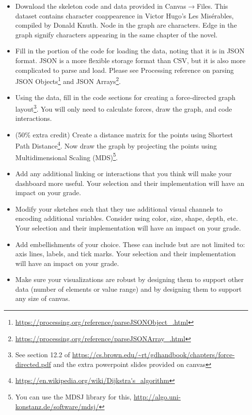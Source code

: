 \documentclass[a4paper,12pt]{article}
\begin{document}
\begin{itemize}

\item Download the skeleton code and data provided in Canvas$\rightarrow$Files. This dataset contains character coappearence in Victor Hugo's Les Misérables, compiled by Donald Knuth. Node in the graph are characters. Edge in the graph signify characters appearing in the same chapter of the novel.

\item Fill in the portion of the code for loading the data, noting that it is in JSON format. JSON is a more flexible storage format than CSV, but it is also more complicated to parse and load. Please see Processing reference on parsing JSON Objects\footnote{\url{https://processing.org/reference/parseJSONObject_.html}} and JSON Arrays\footnote{\url{https://processing.org/reference/parseJSONArray_.html}}.

\item Using the data, fill in the code sections for creating a force-directed graph layout\footnote{See section 12.2 of \url{https://cs.brown.edu/~rt/gdhandbook/chapters/force-directed.pdf} and the extra powerpoint slides provided on canvas}. You will only need to calculate forces, draw the graph, and code interactions.

\item (50\% extra credit) Create a distance matrix for the points using Shortest Path Distance\footnote{\url{https://en.wikipedia.org/wiki/Dijkstra's_algorithm}}. Now draw the graph by projecting the points using Multidimensional Scaling (MDS)\footnote{You can use the MDSJ library for this, \url{http://algo.uni-konstanz.de/software/mdsj/}}.

\item Add any additional linking or interactions that you think will make your dashboard more useful. Your selection and their implementation will have an impact on your grade.

\item Modify your sketches such that they use additional visual channels to encoding additional variables. Consider using color, size, shape, depth, etc. Your selection and their implementation will have an impact on your grade.

\item Add embellishments of your choice. These can include but are not limited to: axis lines, labels, and tick marks. Your selection and their implementation will have an impact on your grade.

\item Make sure your visualizations are robust by designing them to support other data (number of elements or value range) and by designing them to support any size of canvas.

\end{itemize}
\end{document}
